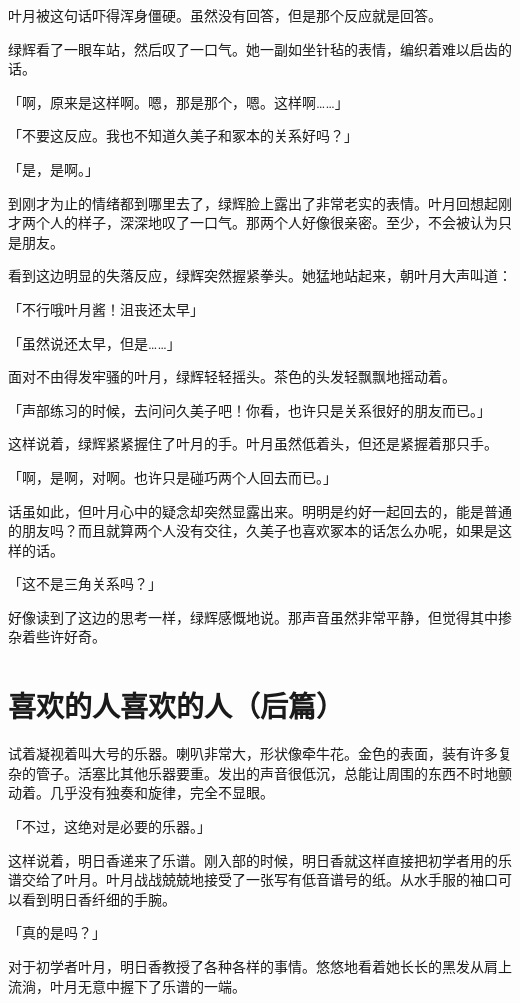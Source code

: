 \documentclass[UTF8]{ctexart}
\begin{document}
    叶月被这句话吓得浑身僵硬。虽然没有回答，但是那个反应就是回答。

    绿辉看了一眼车站，然后叹了一口气。她一副如坐针毡的表情，编织着难以启齿的话。

    「啊，原来是这样啊。嗯，那是那个，嗯。这样啊……」

    「不要这反应。我也不知道久美子和冢本的关系好吗？」

    「是，是啊。」

    到刚才为止的情绪都到哪里去了，绿辉脸上露出了非常老实的表情。叶月回想起刚才两个人的样子，深深地叹了一口气。那两个人好像很亲密。至少，不会被认为只是朋友。

    看到这边明显的失落反应，绿辉突然握紧拳头。她猛地站起来，朝叶月大声叫道：

    「不行哦叶月酱！沮丧还太早」

    「虽然说还太早，但是……」

    面对不由得发牢骚的叶月，绿辉轻轻摇头。茶色的头发轻飘飘地摇动着。

    「声部练习的时候，去问问久美子吧！你看，也许只是关系很好的朋友而已。」

    这样说着，绿辉紧紧握住了叶月的手。叶月虽然低着头，但还是紧握着那只手。

    「啊，是啊，对啊。也许只是碰巧两个人回去而已。」

    话虽如此，但叶月心中的疑念却突然显露出来。明明是约好一起回去的，能是普通的朋友吗？而且就算两个人没有交往，久美子也喜欢冢本的话怎么办呢，如果是这样的话。

    「这不是三角关系吗？」

    好像读到了这边的思考一样，绿辉感慨地说。那声音虽然非常平静，但觉得其中掺杂着些许好奇。
    \section{喜欢的人喜欢的人（后篇）}
    试着凝视着叫大号的乐器。喇叭非常大，形状像牵牛花。金色的表面，装有许多复杂的管子。活塞比其他乐器要重。发出的声音很低沉，总能让周围的东西不时地颤动着。几乎没有独奏和旋律，完全不显眼。

    「不过，这绝对是必要的乐器。」

    这样说着，明日香递来了乐谱。刚入部的时候，明日香就这样直接把初学者用的乐谱交给了叶月。叶月战战兢兢地接受了一张写有低音谱号的纸。从水手服的袖口可以看到明日香纤细的手腕。

    「真的是吗？」

    对于初学者叶月，明日香教授了各种各样的事情。悠悠地看着她长长的黑发从肩上流淌，叶月无意中握下了乐谱的一端。
\end{document}
